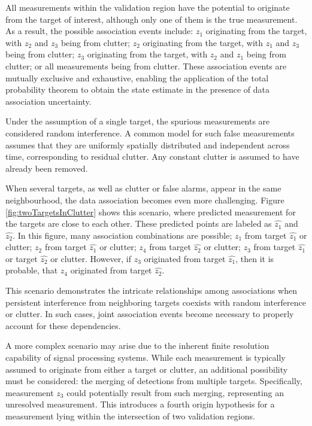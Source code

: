 All measurements within the validation region have the potential to originate from the target of interest, although
only one of them is the true measurement. As a result, the possible association events include: $z_1$ originating
from the target, with $z_2$ and $z_3$ being from clutter; $z_2$ originating from the target, with $z_1$ and $z_3$
being from clutter; $z_3$ originating from the target, with $z_2$ and $z_1$ being from clutter; or all measurements
being from clutter. These association events are mutually exclusive and exhaustive, enabling the application of the
total probability theorem to obtain the state estimate in the presence of data association uncertainty.

Under the assumption of a single target, the spurious measurements are considered random interference. A common model for such false measurements assumes that they are uniformly spatially distributed and independent across time, corresponding to residual clutter. Any constant clutter is assumed to have already been removed.


When several targets, as well as clutter or false alarms, appear in the same neighbourhood, the data association becomes
even more challenging. Figure \ref{fig:twoTargetsInClutter} shows this scenario, where predicted measurement for the
targets are close to each other. These predicted points are labeled as $\hat{z_1}$ and $\hat{z_2}$. In this figure,
many association combinations are possible; $z_1$ from target $\hat{z_1}$ or clutter; $z_2$ from target $\hat{z_1}$
or clutter; $z_4$ from target $\hat{z_2}$ or clutter; $z_3$ from target $\hat{z_1}$ or target $\hat{z_2}$ or clutter. However, if $z_3$ originated from target $\hat{z_1}$, then it is probable, that $z_4$ originated from target $\hat{
    z_2}$.

This scenario demonstrates the intricate relationships among associations when persistent interference from neighboring targets coexists with random interference or clutter. In such cases, joint association events become necessary to properly account for these dependencies.

A more complex scenario may arise due to the inherent finite resolution capability of signal processing systems. While each measurement is typically assumed to originate from either a target or clutter, an additional possibility must be considered: the merging of detections from multiple targets. Specifically, measurement $z_3$ could potentially result from such merging, representing an unresolved measurement. This introduces a fourth origin hypothesis for a measurement lying within the intersection of two validation regions.

